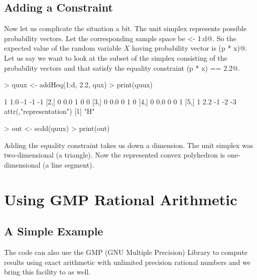 \documentclass{article}
\begin{document}
\subsection{Adding a Constraint}

Now let us complicate the situation a bit.  The unit simplex represents
possible probability vectors.  Let the corresponding sample space be
\verb@x <- 1:d@.  So the expected value of the random variable $X$
having probability vector \verb@p@ is
\verb@sum(p * x)@.  Let us say we want to look at the
subset of the simplex consisting of the
probability vectors \verb@p@ and that satisfy the equality constraint
\verb@sum(p * x) == 2.2@.
\begin{Schunk}
\begin{Sinput}
> quux <- addHeq(1:d, 2.2, qux)
> print(quux)
\end{Sinput}
\begin{Soutput}
     [,1] [,2] [,3] [,4] [,5]
[1,]    1  1.0   -1   -1   -1
[2,]    0  0.0    1    0    0
[3,]    0  0.0    0    1    0
[4,]    0  0.0    0    0    1
[5,]    1  2.2   -1   -2   -3
attr(,"representation")
[1] "H"
\end{Soutput}
\begin{Sinput}
> out <- scdd(quux)
> print(out)
\end{Sinput}
\end{Schunk}
Adding the equality constraint takes us down a dimension.  The unit
simplex was two-dimensional (a triangle).  Now the represented convex
polyhedron is one-dimensional (a line segment).

\section{Using GMP Rational Arithmetic} \label{sec:gmp}

\subsection{A Simple Example}

The \verb@cddlib@ code can also use the GMP (GNU Multiple Precision) Library
to compute results using exact arithmetic with unlimited precision rational
numbers and we bring this facility to \verb@rcdd@ as well.
\end{document}
